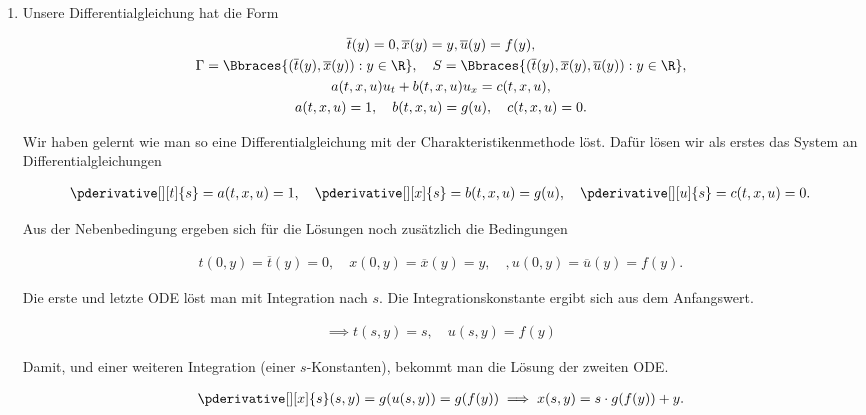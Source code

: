 \begin{solution}

\phantom{}

\begin{enumerate}[label = (\roman*)]

	\item Unsere Differentialgleichung hat die Form

	\begin{gather*}
		\overline{t}(y) = 0,
		\overline{x}(y) = y,
		\overline{u}(y) = f(y), \\
		\Gamma = \Bbraces
		{
			(\overline{t}(y), \overline{x}(y)):
			y \in \R
		},
		\quad
		S = \Bbraces
		{
			(\overline{t}(y), \overline{x}(y), \overline{u}(y)):
			y \in \R
		}, \\
		a(t, x, u) u_t + b(t, x, u)u_x = c(t, x, u), \\
		a(t,x,u) = 1, \quad b(t,x,u) = g(u), \quad c(t,x,u) = 0.
	\end{gather*}

	Wir haben gelernt wie man so eine Differentialgleichung mit der Charakteristikenmethode löst. Dafür lösen wir als erstes das System an Differentialgleichungen

	\begin{align*}
		\pderivative[][t]{s} = a(t,x,u) = 1, \quad \pderivative[][x]{s} = b(t,x,u) = g(u), \quad \pderivative[][u]{s} = c(t,x,u) = 0.
	\end{align*}

	Aus der Nebenbedingung ergeben sich für die Lösungen noch zusätzlich die Bedingungen

	\begin{align*}
		t(0, y) = \overline{t}(y) = 0,
		\quad
		x(0, y) = \overline{x}(y) = y,
		\quad,
		u(0, y) = \overline{u}(y) = f(y).
	\end{align*}

	Die erste und letzte ODE löst man mit Integration nach $s$.
	Die Integrationskonstante ergibt sich aus dem Anfangswert.

	\begin{align*}
		\implies
		t(s,y) = s,
		\quad
		u(s,y) = f(y)
	\end{align*}

	Damit, und einer weiteren Integration (einer $s$-Konstanten), bekommt man die Lösung der zweiten ODE.

	\begin{align*}
		\pderivative[][x]{s}(s,y) = g(u(s,y)) = g(f(y))
		\implies
		x(s, y) = s \cdot g(f(y)) + y.
	\end{align*}


\end{enumerate}
\end{solution}
